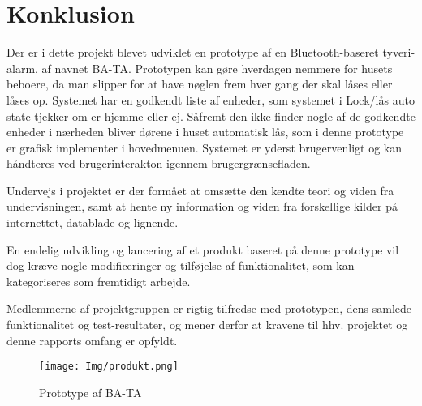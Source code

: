 \graphicspath{{Chapters/Konklusion/}}


\section{Konklusion}

Der er i dette projekt blevet udviklet en prototype af en Bluetooth-baseret tyveri-alarm, af navnet BA-TA.
Prototypen kan gøre hverdagen nemmere for husets beboere, da man slipper for at have nøglen frem hver gang der skal låses eller låses op. Systemet har en godkendt liste af enheder, som systemet i Lock/lås auto state tjekker om er hjemme eller ej. Såfremt den ikke finder nogle af de godkendte enheder i nærheden bliver dørene i huset automatisk lås, som i denne prototype er grafisk implementer i hovedmenuen. Systemet er yderst brugervenligt og kan håndteres ved brugerinterakton igennem brugergrænsefladen.

Undervejs i projektet er der formået at omsætte den kendte teori og viden fra undervisningen, samt at hente ny information og viden fra forskellige kilder på internettet, datablade og lignende. 

En endelig udvikling og lancering af et produkt baseret på denne prototype vil dog kræve nogle modificeringer og tilføjelse af funktionalitet, som kan kategoriseres som fremtidigt arbejde.

Medlemmerne af projektgruppen er rigtig tilfredse med prototypen, dens samlede funktionalitet og test-resultater, og mener derfor at kravene til hhv. projektet og denne rapports omfang er opfyldt.

\begin{figure}[H]
	\centering
	\texttt{[image: Img/produkt.png]}
	\caption{Prototype af BA-TA}
	\label{fig:prototypeBATA}
\end{figure}